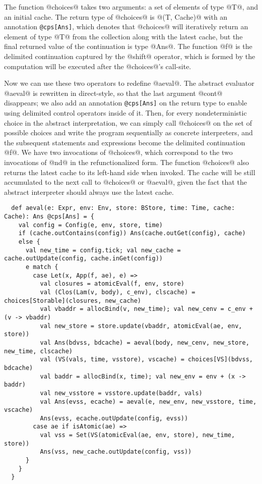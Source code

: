 \documentclass[acmsmall, review]{acmart}\settopmatter{}
\begin{document}
The function @choices@ takes two arguments: a set of elements of type @T@, and an initial cache.
The return type of @choices@ is @(T, Cache)@ with an annotation \verb|@cps[Ans]|, which 
denotes that @choices@ will iteratively return an element of type @T@ from the collection
along with the latest cache, but the final returned value of the continuation is type @Ans@.
The function @f@ is the delimited continuation captured by the @shift@ operator, which
is formed by the computation will be executed after the @choices@'s call-site.

Now we can use these two operators to redefine @aeval@. The abstract evaluator @aeval@ is
rewritten in direct-style, so that the last argument @cont@ disappears; we also add an 
annotation \verb|@cps[Ans]| on the return type to enable using delimited control operators 
inside of it.
Then, for every nondeterministic choice in the abstract interpretation, we can simply call 
@choices@ on the set of possible choices and write the program sequentially as concrete 
interpreters, and the subsequent statements and expressions become the delimited continuation
@f@. We have two invocations of @choices@, which correspond to the two invocations of @nd@ in
the refunctionalized form.
The function @choices@ also returns the latest cache to its left-hand side when invoked.
The cache will be still accumulated to the next call to @choices@ or @aeval@, 
given the fact that the abstract interpreter should always use the latest cache.

\begin{lstlisting}
  def aeval(e: Expr, env: Env, store: BStore, time: Time, cache: Cache): Ans @cps[Ans] = {
    val config = Config(e, env, store, time)
    if (cache.outContains(config)) Ans(cache.outGet(config), cache)
    else {
      val new_time = config.tick; val new_cache = cache.outUpdate(config, cache.inGet(config))
      e match {
        case Let(x, App(f, ae), e) =>
          val closures = atomicEval(f, env, store)
          val (Clos(Lam(v, body), c_env), clscache) = choices[Storable](closures, new_cache)
          val vbaddr = allocBind(v, new_time); val new_cenv = c_env + (v -> vbaddr)
          val new_store = store.update(vbaddr, atomicEval(ae, env, store))
          val Ans(bdvss, bdcache) = aeval(body, new_cenv, new_store, new_time, clscache)
          val (VS(vals, time, vsstore), vscache) = choices[VS](bdvss, bdcache)
          val baddr = allocBind(x, time); val new_env = env + (x -> baddr)
          val new_vsstore = vsstore.update(baddr, vals)
          val Ans(evss, ecache) = aeval(e, new_env, new_vsstore, time, vscache)
          Ans(evss, ecache.outUpdate(config, evss))
        case ae if isAtomic(ae) =>
          val vss = Set(VS(atomicEval(ae, env, store), new_time, store))
          Ans(vss, new_cache.outUpdate(config, vss))
      }
    }
  }
\end{lstlisting}
\end{document}
